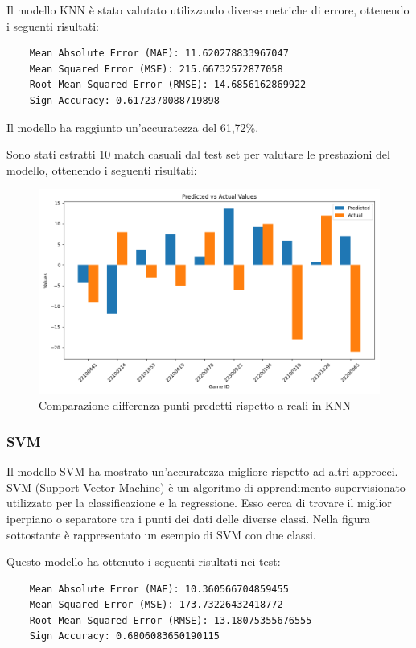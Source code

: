 Il modello KNN è stato valutato utilizzando diverse metriche di errore, ottenendo i seguenti risultati:
\begin{lstlisting}
    Mean Absolute Error (MAE): 11.620278833967047
    Mean Squared Error (MSE): 215.66732572877058
    Root Mean Squared Error (RMSE): 14.6856162869922
    Sign Accuracy: 0.6172370088719898
\end{lstlisting}
Il modello ha raggiunto un'accuratezza del 61,72\%.

Sono stati estratti 10 match casuali dal test set per valutare le prestazioni del modello, ottenendo i seguenti risultati:
\begin{figure}[H]
    \centering
    \includegraphics[width=0.7\linewidth]{img/knn_istogramma.png}
    \caption{Comparazione differenza punti predetti rispetto a reali in KNN}
    \label{fig:enter-label}
\end{figure}

\subsubsection{SVM}

Il modello SVM ha mostrato un'accuratezza migliore rispetto ad altri approcci. SVM (Support Vector Machine) è un algoritmo di apprendimento supervisionato utilizzato per la classificazione e la regressione. Esso cerca di trovare il miglior iperpiano o separatore tra i punti dei dati delle diverse classi. Nella figura sottostante è rappresentato un esempio di SVM con due classi.

Questo modello ha ottenuto i seguenti risultati nei test:

\begin{lstlisting}
    Mean Absolute Error (MAE): 10.360566704859455
    Mean Squared Error (MSE): 173.73226432418772
    Root Mean Squared Error (RMSE): 13.18075355676555
    Sign Accuracy: 0.6806083650190115
\end{lstlisting}

